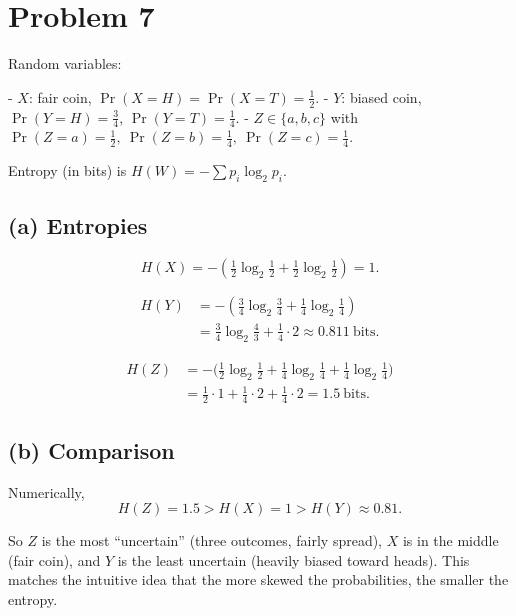 \section*{Problem 7}

Random variables:

- \(X\): fair coin, \(\Pr(X=H)=\Pr(X=T)=\tfrac12\).
- \(Y\): biased coin, \(\Pr(Y=H)=\tfrac34\), \(\Pr(Y=T)=\tfrac14\).
- \(Z\in\{a,b,c\}\) with
  \(\Pr(Z=a)=\tfrac12,\ \Pr(Z=b)=\tfrac14,\ \Pr(Z=c)=\tfrac14\).

Entropy (in bits) is \(H(W) = -\sum p_i \log_2 p_i\).

\subsection*{(a) Entropies}

\[
H(X) = -\left(\tfrac12\log_2\tfrac12 + \tfrac12\log_2\tfrac12\right)
      = 1.
\]

\[
\begin{aligned}
H(Y)
&= -\left(\tfrac34\log_2\tfrac34 + \tfrac14\log_2\tfrac14\right)\\
&= \tfrac34\log_2\tfrac{4}{3} + \tfrac14\cdot 2
 \approx 0.811\ \text{bits}.
\end{aligned}
\]

\[
\begin{aligned}
H(Z)
&= -\Big(
\tfrac12\log_2\tfrac12
+ \tfrac14\log_2\tfrac14
+ \tfrac14\log_2\tfrac14
\Big)\\
&= \tfrac12\cdot 1 + \tfrac14\cdot 2 + \tfrac14\cdot 2
= 1.5\ \text{bits}.
\end{aligned}
\]

\subsection*{(b) Comparison}

Numerically,
\[
H(Z)=1.5 > H(X)=1 > H(Y)\approx 0.81.
\]

So \(Z\) is the most “uncertain” (three outcomes, fairly spread),
\(X\) is in the middle (fair coin), and \(Y\) is the least uncertain
(heavily biased toward heads). This matches the intuitive idea that the
more skewed the probabilities, the smaller the entropy.
